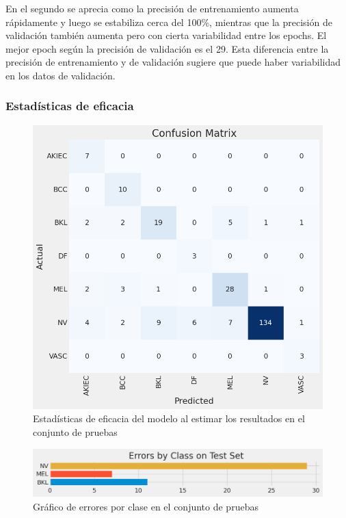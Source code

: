 En el segundo se aprecia como la precisión de entrenamiento aumenta rápidamente y luego se estabiliza cerca del 100\%, mientras que la precisión de validación también aumenta pero con cierta variabilidad entre los epochs. El mejor epoch según la precisión de validación es el 29. Esta diferencia entre la precisión de entrenamiento y de validación sugiere que puede haber variabilidad en los datos de validación.

	\subsubsection{Estadísticas de eficacia}\label{sub:accuracy_statistic_p1}
\begin{figure}[ht]%
   \begin{center}
   \includegraphics[width=1\textwidth]{./Graphics/confussionmatrix_p1.png}
   \caption{Estadísticas de eficacia del modelo al estimar los resultados en el conjunto de pruebas\label{fig:confussion_matrix_p1}}
   \end{center}
   \end{figure}

   \begin{figure}[ht]%
      \begin{center}
      \includegraphics[width=1\textwidth]{./Graphics/errorByClass_p1.png}
      \caption{Gráfico de errores por clase en el conjunto de pruebas\label{fig:class_errors_p1}}
      \end{center}
      \end{figure} 


